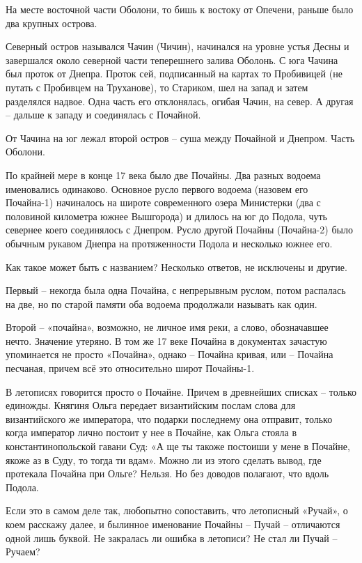 На месте восточной части Оболони, то бишь к востоку от Опечени, раньше было два крупных острова.

Северный остров назывался Чачин (Чичин), начинался на уровне устья Десны и завершался около северной части теперешнего залива Оболонь. С юга Чачина был проток от Днепра. Проток сей, подписанный на картах то Пробивицей (не путать с Пробивцем на Труханове), то Стариком, шел на запад и затем разделялся надвое. Одна часть его отклонялась, огибая Чачин, на север. А другая – дальше к западу и соединялась с Почайной.

От Чачина на юг лежал второй остров – суша между Почайной и Днепром. Часть Оболони.

По крайней мере в конце 17 века было две Почайны. Два разных водоема именовались одинаково. Основное русло первого водоема (назовем его Почайна-1) начиналось на широте современного озера Министерки (два с половиной километра южнее Вышгорода) и длилось на юг до Подола, чуть севернее коего соединялось с Днепром. Русло другой Почайны (Почайна-2) было обычным рукавом Днепра на протяженности Подола и несколько южнее его.

Как такое может быть с названием? Несколько ответов, не исключены и другие.

Первый – некогда была одна Почайна, с непрерывным руслом, потом распалась на две, но по старой памяти оба водоема продолжали называть как один.

Второй – «почайна», возможно, не личное имя реки, а слово, обозначавшее нечто. Значение утеряно. В том же 17 веке Почайна в документах зачастую упоминается не просто «Почайна», однако – Почайна кривая, или – Почайна песчаная, причем всё это относительно широт Почайны-1.

В летописях говорится просто о Почайне. Причем в древнейших списках – только единожды. Княгиня Ольга передает византийским послам слова для византийского же императора, что подарки последнему она отправит, только когда император лично постоит у нее в Почайне, как Ольга стояла в константинопольской гавани Суд: «А ще ты такоже постоиши у мене в Почайне, якоже аз в Суду, то тогда ти вдам». Можно ли из этого сделать вывод, где протекала Почайна при Ольге? Нельзя. Но без доводов полагают, что вдоль Подола.

Если это в самом деле так, любопытно сопоставить, что летописный «Ручай», о коем расскажу далее, и былинное именование Почайны – Пучай – отличаются одной лишь буквой. Не закралась ли ошибка в летописи? Не стал ли Пучай – Ручаем?

